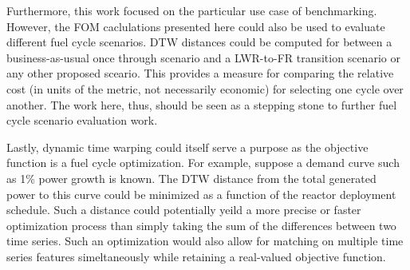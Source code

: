 Furthermore, this work focused on the particular use case of benchmarking.
However, the FOM caclulations presented here could also be used to evaluate 
different fuel cycle scenarios. DTW distances could be computed for between
a business-as-usual once through scenario and a LWR-to-FR transition
scenario or any other proposed sceario. This provides a measure for 
comparing the relative cost (in units of the metric, not necessarily 
economic) for selecting one cycle over another. The work here, thus, 
should be seen as a stepping stone to further fuel cycle scenario evaluation
work.

Lastly, dynamic time warping could itself serve a purpose as the objective 
function is a fuel cycle optimization.  For example, suppose a demand curve 
such as 1\% power growth is known. The DTW distance from the total generated
power to this curve could be minimized as a function of the reactor 
deployment schedule. Such a distance could potentially yeild a more 
precise or faster optimization process than simply taking the sum of 
the differences between two time series. Such an optimization would also allow
for matching on multiple time series features simeltaneously while retaining
a real-valued objective function.

